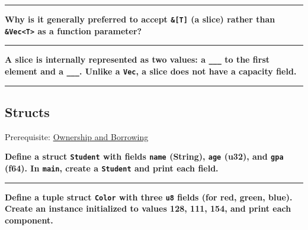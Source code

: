 \documentclass[
  11pt,
]{article}
\newenvironment{Shaded}{}{}
\begin{document}
\begin{Shaded}
\begin{Highlighting}[]

\end{Highlighting}
\end{Shaded}

\begin{center}\rule{0.5\linewidth}{0.5pt}\end{center}

\textbf{Why is it generally preferred to accept \texttt{\&{[}T{]}} (a
slice) rather than \texttt{\&Vec\textless{}T\textgreater{}} as a
function parameter?}

\begin{center}\rule{0.5\linewidth}{0.5pt}\end{center}

\textbf{A slice is internally represented as two values: a
\texttt{\_\_\_} to the first element and a \texttt{\_\_\_}. Unlike a
\texttt{Vec}, a slice does not have a capacity field.}

\begin{center}\rule{0.5\linewidth}{0.5pt}\end{center}

\subsection{Structs}\label{structs}

Prerequisite: \hyperref[ownership-and-borrowing]{Ownership and
Borrowing}

\textbf{Define a struct \texttt{Student} with fields \texttt{name}
(String), \texttt{age} (u32), and \texttt{gpa} (f64). In \texttt{main},
create a \texttt{Student} and print each field.}

\begin{Shaded}
\begin{Highlighting}[]

\end{Highlighting}
\end{Shaded}

\begin{center}\rule{0.5\linewidth}{0.5pt}\end{center}

\textbf{Define a tuple struct \texttt{Color} with three \texttt{u8}
fields (for red, green, blue). Create an instance initialized to values
128, 111, 154, and print each component.}

\begin{Shaded}
\begin{Highlighting}[]

\end{Highlighting}
\end{Shaded}
\end{document}

